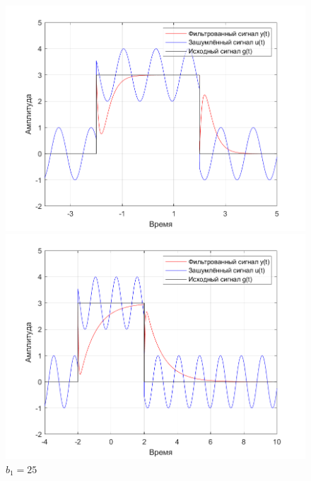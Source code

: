 \documentclass[a4paper]{article}
\begin{document}
\begin{figure}[H]
    \begin{minipage}{0.5\textwidth}
        \centering
        \includegraphics[width=\linewidth]{ex1_2/a1=0_a2=25_b1=10.5_b2=25_d=5/h2.png}
        \caption{$b_1=10.5$}
    \end{minipage}
    \begin{minipage}{0.5\textwidth}
        \centering
        \includegraphics[width=\linewidth]{ex1_2/a1=0_a2=25_b1=25_b2=25_d=5/h2.png}
        \caption{$b_1=25$}
    \end{minipage}
\end{figure}
\end{document}
